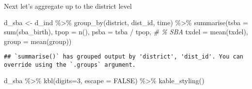 \documentclass[
]{article}
\newenvironment{Shaded}{\begin{snugshade}}{\end{snugshade}}
\newcommand{\AttributeTok}[1]{\textcolor[rgb]{0.77,0.63,0.00}{#1}}
\newcommand{\CommentTok}[1]{\textcolor[rgb]{0.56,0.35,0.01}{\textit{#1}}}
\newcommand{\ConstantTok}[1]{\textcolor[rgb]{0.00,0.00,0.00}{#1}}
\newcommand{\DecValTok}[1]{\textcolor[rgb]{0.00,0.00,0.81}{#1}}
\newcommand{\FunctionTok}[1]{\textcolor[rgb]{0.00,0.00,0.00}{#1}}
\newcommand{\NormalTok}[1]{#1}
\newcommand{\OtherTok}[1]{\textcolor[rgb]{0.56,0.35,0.01}{#1}}
\newcommand{\SpecialCharTok}[1]{\textcolor[rgb]{0.00,0.00,0.00}{#1}}
\begin{document}
Next let's aggregate up to the district level

\begin{Shaded}
\begin{Highlighting}[]
\NormalTok{d\_sba }\OtherTok{\textless{}{-}}\NormalTok{ d\_ind }\SpecialCharTok{\%\textgreater{}\%}
  \FunctionTok{group\_by}\NormalTok{(district, dist\_id, time) }\SpecialCharTok{\%\textgreater{}\%}
  \FunctionTok{summarise}\NormalTok{(}\AttributeTok{tsba =} \FunctionTok{sum}\NormalTok{(sba\_birth),}
         \AttributeTok{tpop =} \FunctionTok{n}\NormalTok{(),}
         \AttributeTok{psba =}\NormalTok{ tsba }\SpecialCharTok{/}\NormalTok{ tpop, }\CommentTok{\# \% SBA}
         \AttributeTok{txdel =} \FunctionTok{mean}\NormalTok{(txdel),}
         \AttributeTok{group =} \FunctionTok{mean}\NormalTok{(group))}
\end{Highlighting}
\end{Shaded}

\begin{verbatim}
## `summarise()` has grouped output by 'district', 'dist_id'. You can override using the `.groups` argument.
\end{verbatim}

\begin{Shaded}
\begin{Highlighting}[]
\NormalTok{d\_sba }\SpecialCharTok{\%\textgreater{}\%}
  \FunctionTok{kbl}\NormalTok{(}\AttributeTok{digits=}\DecValTok{3}\NormalTok{, }\AttributeTok{escape =} \ConstantTok{FALSE}\NormalTok{) }\SpecialCharTok{\%\textgreater{}\%}
  \FunctionTok{kable\_styling}\NormalTok{()}
\end{Highlighting}
\end{Shaded}
\end{document}

